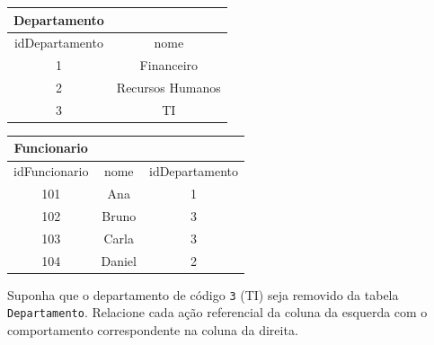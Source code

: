 \documentclass[12pt,a4paper]{article}
\begin{document}
\begin{enumerate}
\begin{center}
\end{center}

\begin{center}
\begin{tabular}{|c|c|}
\hline
\textbf{Departamento} & \\
\hline
idDepartamento & nome \\
\hline
1 & Financeiro \\
2 & Recursos Humanos \\
3 & TI \\
\hline
\end{tabular}
\hspace{1cm}
\begin{tabular}{|c|c|c|}
\hline
\textbf{Funcionario} & & \\
\hline
idFuncionario & nome & idDepartamento \\
\hline
101 & Ana & 1 \\
102 & Bruno & 3 \\
103 & Carla & 3 \\
104 & Daniel & 2 \\
\hline
\end{tabular}
\end{center}

Suponha que o departamento de código \texttt{3} (TI) seja removido da tabela \texttt{Departamento}. Relacione cada ação referencial da coluna da esquerda com o comportamento correspondente na coluna da direita.


\end{enumerate}
\end{document}
